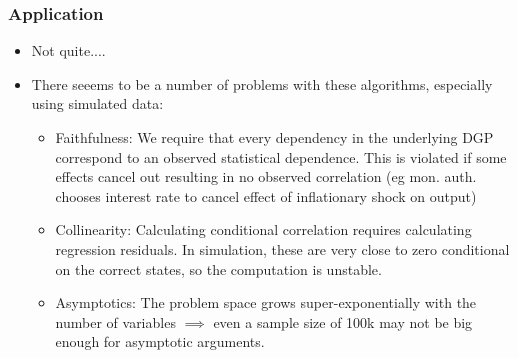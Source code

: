 \documentclass{beamer}
\begin{document}
\begin{frame}
    \frametitle{Application}
    \begin{itemize}
        \item Not quite....
        \item There seeems to be a number of problems with these algorithms, especially using simulated data:
        \begin{itemize}
            \item Faithfulness: We require that every dependency in the underlying DGP correspond to an observed statistical dependence. This is violated if some effects cancel out resulting in no observed correlation (eg mon. auth. chooses interest rate to cancel effect of inflationary shock on output)
            \item Collinearity: Calculating conditional correlation requires calculating regression residuals. In simulation, these are very close to zero conditional on the correct states, so the computation is unstable.
            \item Asymptotics: The problem space grows super-exponentially with the number of variables $\implies$ even a sample size of 100k may not be big enough for asymptotic arguments.
        \end{itemize}
    \end{itemize}
\end{frame}
\end{document}
